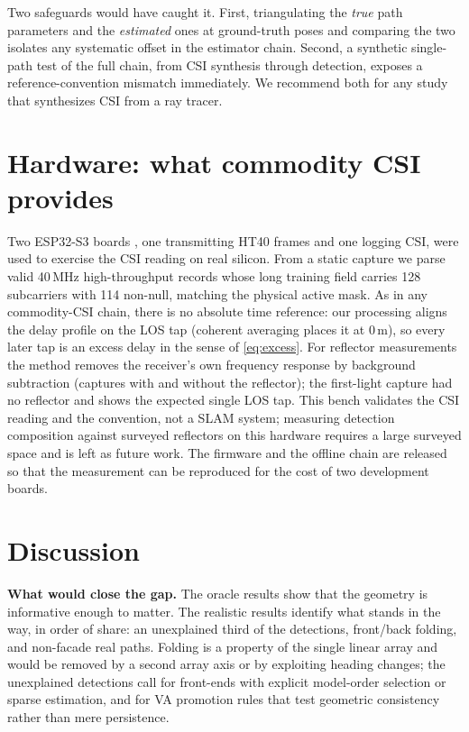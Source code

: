 \documentclass[preprint,12pt]{elsarticle}
\begin{document}
Two safeguards would have caught it. First, triangulating the \emph{true} path parameters and the
\emph{estimated} ones at ground-truth poses and comparing the two isolates any systematic offset
in the estimator chain. Second, a synthetic single-path test of the full chain, from CSI
synthesis through detection, exposes a reference-convention mismatch immediately. We recommend
both for any study that synthesizes CSI from a ray tracer.

\section{Hardware: what commodity CSI provides}\label{sec:hw}

Two ESP32-S3 boards \cite{espressif_esp32,hernandez2020esp32}, one transmitting HT40 frames and one
logging CSI, were used to exercise the CSI reading on real silicon. From a static
capture we parse valid 40\,MHz high-throughput records whose long training field carries 128
subcarriers with 114 non-null, matching the physical active mask. As in any commodity-CSI
chain, there is no absolute time reference: our processing aligns the delay profile on the LOS tap
(coherent averaging places it at 0\,m), so every later tap is an excess delay in the sense of
\eqref{eq:excess}. For reflector measurements the method removes the receiver's own frequency
response by background subtraction (captures with and without the reflector); the first-light
capture had no reflector and shows the expected single LOS tap. This bench validates the CSI reading and the
convention, not a SLAM system; measuring detection composition against surveyed reflectors on
this hardware requires a large surveyed space and is left as future work. The firmware and the
offline chain are released so that the measurement can be reproduced for the cost of two
development boards.

\section{Discussion}\label{sec:discussion}

\textbf{What would close the gap.} The oracle results show that the geometry is informative
enough to matter. The realistic results identify what stands in the way, in order of share: an
unexplained third of the detections, front/back folding, and non-facade real paths. Folding is a
property of the single linear array and would be removed by a second array axis or by exploiting
heading changes; the unexplained detections call for front-ends with explicit model-order
selection or sparse estimation, and for VA promotion rules that test geometric consistency rather
than mere persistence.
\end{document}
